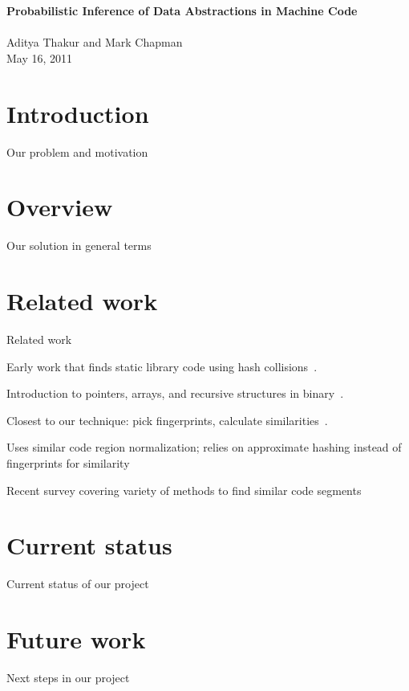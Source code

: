 \documentclass[12pt]{article}
\begin{document}
\begin{center}

\textbf{Probabilistic Inference of Data Abstractions in Machine Code \\ ~\\}
Aditya Thakur and Mark Chapman \\ May 16, 2011

\end{center}

\section{Introduction}

Our problem and motivation

\section{Overview}

Our solution in general terms

\section{Related work}

Related work

Early work that finds static library code using hash collisions~\cite{1998-Emmerik-ASWEC}.

Introduction to pointers, arrays, and recursive structures in binary~\cite{1999-Mycroft-ESOP}.

Closest to our technique: pick fingerprints, calculate similarities~\cite{2009-Smith-IWSC}.

Uses similar code region normalization; relies on approximate hashing instead of fingerprints for similarity~\cite{2009-Saebjoernsen-ISSTA}

Recent survey covering variety of methods to find similar code segments~\cite{2009-Roy}

\section{Current status}

Current status of our project

\section{Future work}

Next steps in our project



\end{document}
